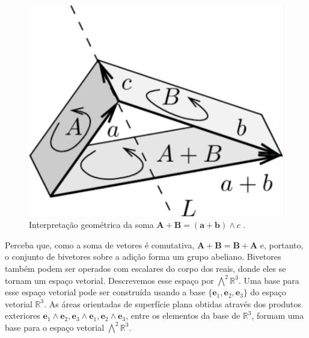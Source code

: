 \documentclass[a4paper,12pt]{report}
\theoremstyle{plain}
\theoremstyle{definition}
\begin{document}
	\begin{figure}[H]
		\begin{center}
			\includegraphics[width=0.32\linewidth]{figures/2bladeSoma.pdf}
		\end{center}
		\caption{Interpretação geométrica da soma $\mathbf A+\mathbf B = (\mathbf a+\mathbf b)\wedge c$ \cite{lundholm2009clifford}.}
		\label{fig:2bladeSoma}
	\end{figure}
	
	Perceba que, como a soma de vetores é comutativa, $\mathbf A+\mathbf B = \mathbf B+\mathbf A$ e, portanto, o conjunto de bivetores sobre a adição forma um grupo abeliano. Bivetores também podem ser operados com escalares do corpo dos reais, donde eles se tornam um espaço vetorial. Descrevemos esse espaço por $\bigwedge^2\mathbb{R}^3$. Uma base para esse espaço vetorial pode ser construída usando a base $\{\mathbf e_1,\mathbf e_2,\mathbf e_3\}$ do espaço vetorial $\mathbb{R}^3$. As áreas orientadas de superfície plana obtidas através dos produtos exteriores $\mathbf e_1 \wedge \mathbf e_2, \mathbf e_3 \wedge \mathbf e_1, \mathbf e_2 \wedge \mathbf e_3$, entre os elementos da base de $\mathbb{R}^3$, formam uma base para o espaço vetorial $\bigwedge^2\mathbb{R}^3$.
	
\end{document}
